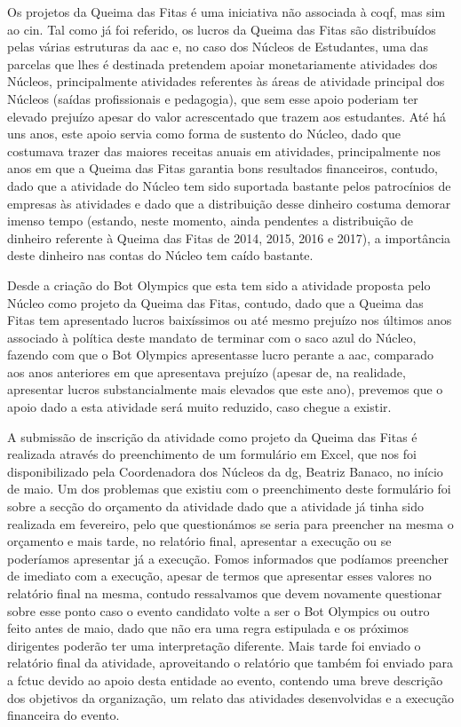 Os projetos da Queima das Fitas é uma iniciativa não associada à \acrshort{coqf}, mas sim ao \acrfull{cin}. Tal como já foi referido, os lucros da Queima das Fitas são distribuídos pelas várias estruturas da \acrshort{aac} e, no caso dos Núcleos de Estudantes, uma das parcelas que lhes é destinada pretendem apoiar monetariamente atividades dos Núcleos, principalmente atividades referentes às áreas de atividade principal dos Núcleos (saídas profissionais e pedagogia), que sem esse apoio poderiam ter elevado prejuízo apesar do valor acrescentado que trazem aos estudantes. Até há uns anos, este apoio servia como forma de sustento do Núcleo, dado que costumava trazer das maiores receitas anuais em atividades, principalmente nos anos em que a Queima das Fitas garantia bons resultados financeiros, contudo, dado que a atividade do Núcleo tem sido suportada bastante pelos patrocínios de empresas às atividades e dado que a distribuição desse dinheiro costuma demorar imenso tempo (estando, neste momento, ainda pendentes a distribuição de dinheiro referente à Queima das Fitas de 2014, 2015, 2016 e 2017), a importância deste dinheiro nas contas do Núcleo tem caído bastante.

Desde a criação do Bot Olympics que esta tem sido a atividade proposta pelo Núcleo como projeto da Queima das Fitas, contudo, dado que a Queima das Fitas tem apresentado lucros baixíssimos ou até mesmo prejuízo nos últimos anos associado à política deste mandato de terminar com o saco azul do Núcleo, fazendo com que o Bot Olympics apresentasse lucro perante a \acrshort{aac}, comparado aos anos anteriores em que apresentava prejuízo (apesar de, na realidade, apresentar lucros substancialmente mais elevados que este ano), prevemos que o apoio dado a esta atividade será muito reduzido, caso chegue a existir.

A submissão de inscrição da atividade como projeto da Queima das Fitas é realizada através do preenchimento de um formulário em Excel, que nos foi disponibilizado pela Coordenadora dos Núcleos da \acrshort{dg}, Beatriz Banaco, no início de maio. Um dos problemas que existiu com o preenchimento deste formulário foi sobre a secção do orçamento da atividade dado que a atividade já tinha sido realizada em fevereiro, pelo que questionámos se seria para preencher na mesma o orçamento e mais tarde, no relatório final, apresentar a execução ou se poderíamos apresentar já a execução. Fomos informados que podíamos preencher de imediato com a execução, apesar de termos que apresentar esses valores no relatório final na mesma, contudo ressalvamos que devem novamente questionar sobre esse ponto caso o evento candidato volte a ser o Bot Olympics ou outro feito antes de maio, dado que não era uma regra estipulada e os próximos dirigentes poderão ter uma interpretação diferente. Mais tarde foi enviado o relatório final da atividade, aproveitando o relatório que também foi enviado para a \acrshort{fctuc} devido ao apoio desta entidade ao evento, contendo uma breve descrição dos objetivos da organização, um relato das atividades desenvolvidas e a execução financeira do evento.